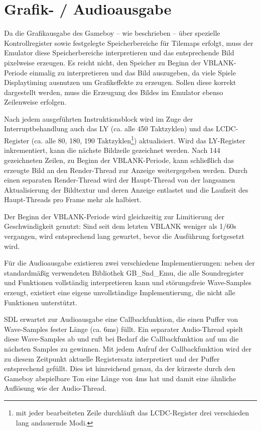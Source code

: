 \documentclass[a4paper]{scrartcl}
\begin{document}
\section{Grafik- / Audioausgabe}

Da die Grafikausgabe des Gameboy -- wie beschrieben -- über spezielle Kontrollregister sowie festgelegte Speicherbereiche für Tilemaps erfolgt, muss der Emulator diese Speicherbereiche interpretieren und das entsprechende Bild pixelweise erzeugen. Es reicht nicht, den Speicher zu Beginn der VBLANK-Periode einmalig zu interpretieren und das Bild auszugeben, da viele Spiele Displaytiming ausnutzen um Grafikeffekte zu erzeugen. Sollen diese korrekt dargestellt werden, muss die Erzeugung des Bildes im Emulator ebenso Zeilenweise erfolgen.

Nach jedem ausgeführten Instruktionsblock wird im Zuge der Interruptbehandlung auch das LY (ca. alle 450 Taktzyklen) und das LCDC-Register (ca. alle 80, 180, 190 Taktzyklen\footnote{mit jeder bearbeiteten Zeile durchläuft das LCDC-Register drei verschieden lang andauernde Modi.}) aktualisiert. Wird das LY-Register inkrementiert, kann die nächste Bildzeile gezeichnet werden. Nach 144 gezeichneten Zeilen, zu Beginn der VBLANK-Periode, kann schließlich das erzeugte Bild an den Render-Thread zur Anzeige weitergegeben werden. Durch einen separaten Render-Thread wird der Haupt-Thread von der langsamen Aktualisierung der Bildtextur und deren Anzeige entlastet und die Laufzeit des Haupt-Threads pro Frame mehr als halbiert.

Der Beginn der VBLANK-Periode wird gleichzeitig zur Limitierung der Geschwindigkeit genutzt: Sind seit dem letzten VBLANK weniger als 1/60s vergangen, wird entsprechend lang gewartet, bevor die Ausführung fortgesetzt wird.

Für die Audioausgabe existieren zwei verschiedene Implementierungen: neben der standardmäßig verwendeten Bibliothek GB\_Snd\_Emu, die alle Soundregister und Funktionen vollständig interpretieren kann und störungsfreie Wave-Samples erzeugt, existiert eine eigene unvollständige Implementierung, die nicht alle Funktionen unterstützt.

SDL erwartet zur Audioausgabe eine Callbackfunktion, die einen Puffer von Wave-Samples fester Länge (ca. 6ms) füllt. Ein separater Audio-Thread spielt diese Wave-Samples ab und ruft bei Bedarf die Callbackfunktion auf um die nächsten Samples zu gewinnen. Mit jedem Aufruf der Callbackfunktion wird der zu diesem Zeitpunkt aktuelle Registersatz interpretiert und der Puffer entsprechend gefüllt. Dies ist hinreichend genau, da der kürzeste durch den Gameboy abspielbare Ton eine Länge von 4ms hat und damit eine ähnliche Auflösung wie der Audio-Thread.
\end{document}
